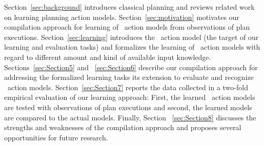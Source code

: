Section~\ref{sec:background} introduces classical planning and reviews related work on learning planning action models. Section~\ref{sec:motivation} motivates our compilation approach for learning of \strips\ action models from observations of plan executions. Section~\ref{sec:learning} introduces the \strips\ action model (the target of our learning and evaluation tasks) and formalizes the learning of \strips\ action models with regard to different amount and kind of available input knowledge. Sections~\ref{sec:Section5} and ~\ref{sec:Section6} describe our compilation approach for addressing the formalized learning tasks its extension to evaluate and recognize \strips\ action models. Section~\ref{sec:Section7} reports the data collected in a two-fold empirical evaluation of our learning approach: First, the learned \strips\ action models are tested with observations of plan executions and second, the learned models are compared to the actual models. Finally, Section ~\ref{sec:Section8} discusses the strengths and weaknesses of the compilation approach and proposes several opportunities for future research.

 
